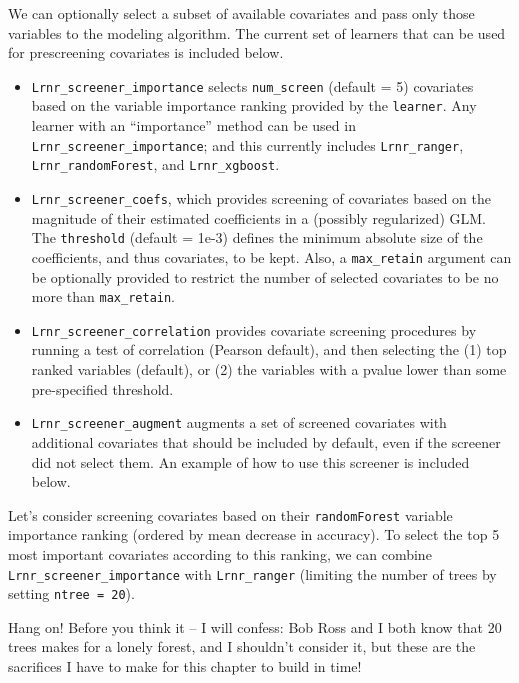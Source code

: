 \documentclass[12pt, krantz2,]{krantz}
\providecommand{\tightlist}{%
  \setlength{\itemsep}{0pt}\setlength{\parskip}{0pt}}
\theoremstyle{definition}
\theoremstyle{definition}
\theoremstyle{definition}
\newcommand{\1}{\mathbbm{1}}
\begin{document}
We can optionally select a subset of available covariates and pass only those
variables to the modeling algorithm. The current set of learners that can be
used for prescreening covariates is included below.

\begin{itemize}
\tightlist
\item
  \texttt{Lrnr\_screener\_importance} selects \texttt{num\_screen} (default = 5) covariates
  based on the variable importance ranking provided by the \texttt{learner}. Any
  learner with an ``importance'' method can be used in \texttt{Lrnr\_screener\_importance};
  and this currently includes \texttt{Lrnr\_ranger}, \texttt{Lrnr\_randomForest}, and
  \texttt{Lrnr\_xgboost}.
\item
  \texttt{Lrnr\_screener\_coefs}, which provides screening of covariates based on the
  magnitude of their estimated coefficients in a (possibly regularized) GLM.
  The \texttt{threshold} (default = 1e-3) defines the minimum absolute size of the
  coefficients, and thus covariates, to be kept. Also, a \texttt{max\_retain} argument
  can be optionally provided to restrict the number of selected covariates to
  be no more than \texttt{max\_retain}.
\item
  \texttt{Lrnr\_screener\_correlation} provides covariate screening procedures by
  running a test of correlation (Pearson default), and then selecting the (1)
  top ranked variables (default), or (2) the variables with a pvalue lower than
  some pre-specified threshold.
\item
  \texttt{Lrnr\_screener\_augment} augments a set of screened covariates with additional
  covariates that should be included by default, even if the screener did not
  select them. An example of how to use this screener is included below.
\end{itemize}

Let's consider screening covariates based on their \texttt{randomForest} variable
importance ranking (ordered by mean decrease in accuracy). To select the top
5 most important covariates according to this ranking, we can combine
\texttt{Lrnr\_screener\_importance} with \texttt{Lrnr\_ranger} (limiting the number of trees by
setting \texttt{ntree\ =\ 20}).

Hang on! Before you think it -- I will confess: Bob Ross and I both know that 20
trees makes for a lonely forest, and I shouldn't consider it, but these are the
sacrifices I have to make for this chapter to build in time!
\end{document}
